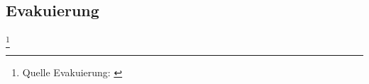\subsection{Evakuierung} 
\footnote{Quelle Evakuierung: \cite{evakuierung_deich} \cite{evakuierung_hochwasser}}


